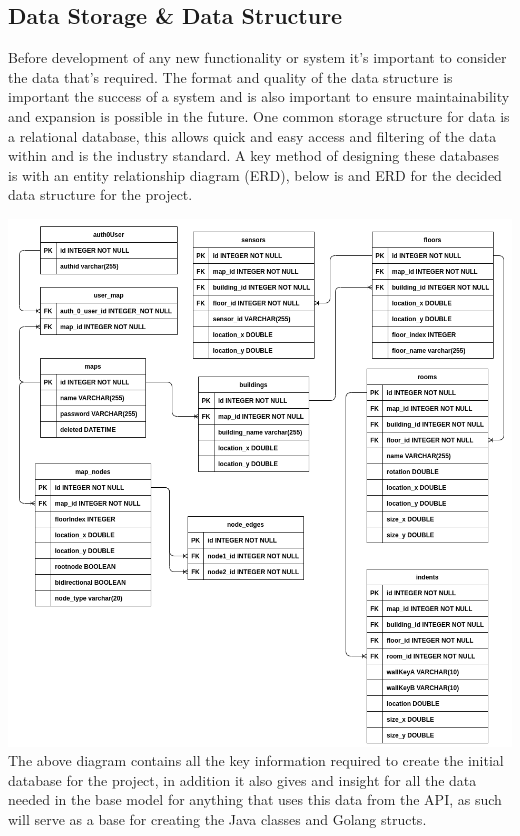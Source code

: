\subsection{Data Storage \& Data Structure}
Before development of any new functionality or system it's important to consider the data that's required. The format and quality of the data structure is important the success of a system and is also important to ensure maintainability and expansion is possible in the future. One common storage structure for data is a relational database, this allows quick and easy access and filtering of the data within and is the industry standard. A key method of designing these databases is with an entity relationship diagram (ERD), below is and ERD for the decided data structure for the project.

\includegraphics[width=\linewidth]{./images/designs/erddetailed.png}\\
The above diagram contains all the key information required to create the initial database for the project, in addition it also gives and insight for all the data needed in the base model for anything that uses this data from the API, as such will serve as a base for creating the Java classes and Golang structs. 

